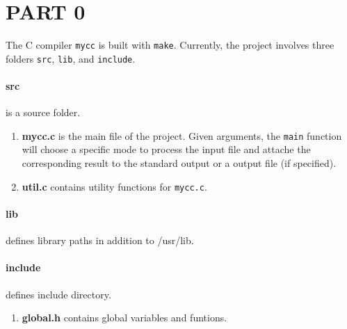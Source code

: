\section*{PART 0}

The C compiler \texttt{mycc} is built with \texttt{make}.
Currently, the project involves three folders 
\texttt{src}, \texttt{lib}, and \texttt{include}.

\paragraph{\large\textbf{src}} is a source folder.
\begin{enumerate}
    \item \textbf{mycc.c} is the main file of the project. Given arguments, the \texttt{main} function will choose a specific mode to process the input file and attache the corresponding result to the standard output or a output file (if specified).
    \item \textbf{util.c} contains utility functions for \texttt{mycc.c}.
\end{enumerate}

\paragraph{\large\textbf{lib}} defines library paths in addition to /usr/lib.

\paragraph{\large\textbf{include}} defines include directory.
\begin{enumerate}
    \item \textbf{global.h} contains global variables and funtions.
\end{enumerate} 

